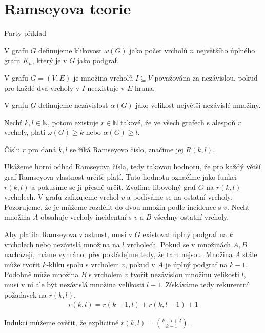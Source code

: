 \section{Ramseyova teorie}
\begin{t_example}
  Party příklad %
\end{t_example}

\begin{t_definition}
  V grafu $G$ definujeme klikovost $\omega(G)$ jako počet vrcholů $n$ největšího úplného grafu $K_n$, který je v $G$ jako podgraf.
\end{t_definition}

\begin{t_definition}
  V grafu $G=(V,E)$ je množina vrcholů $I\subseteq V$ považována za nezávislou, pokud pro každé dva vrcholy v $I$ neexistuje v $E$ hrana.
\end{t_definition}

\begin{t_definition}
  V grafu $G$ definujeme nezávislost $\alpha(G)$ jako velikost největší nezávislé množiny.
\end{t_definition}

\begin{t_theorem}
  Nechť $k,l\in\mathbb{N}$, potom existuje $r\in\mathbb{N}$ takové, že ve všech grafech s alespoň $r$ vrcholy, platí $\omega(G)\geq k$ nebo $\alpha(G)\geq l$.
\end{t_theorem}

\begin{t_remark}
  Číslu $r$ pro daná $k, l$ se říká Ramseyovo číslo, značíme jej $R(k, l)$.
\end{t_remark}

\begin{t_proof}
  Ukážeme horní odhad Ramseyova čísla, tedy takovou hodnotu, že pro každý větší graf Ramseyova vlastnost určitě platí. Tuto hodnotu označíme jako funkci $r(k,l)$ a pokusíme se jí přesně určit. Zvolíme libovolný graf $G$ na $r(k,l)$ vrcholech. V grafu zafixujeme vrchol $v$ a podíváme se na ostatní vrcholy. Pozorujeme, že je můžeme rozdělit do dvou množin podle incidence s $v$. Nechť množina $A$ obsahuje vrcholy incidentní s $v$ a $B$ všechny ostatní vrcholy.
  
  Aby platila Ramseyova vlastnost, musí v $G$ existovat úplný podgraf na $k$ vrcholech nebo nezávislá množina na $l$ vrcholech. Pokud se v množinách $A,B$ nacházejí, máme vyhráno, předpokládejme tedy, že tam nejsou. Množina $A$ stále může tvořit $k$-kliku spolu s vrcholem $v$, pokud v $A$ je úplný podgraf na $k-1$. Podobně může množina $B$ s vrcholem $v$ tvořit nezávislou množinu velikosti $l$, musí v ní ale být nezávislá množina velikosti $l-1$. Získáváme tedy rekurentní požadavek na $r(k,l)$.
  \begin{align*}
    r(k,l)=r(k-1,l)+r(k,l-1)+1
  \end{align*}

  Indukcí můžeme ověřit, že explicitně $r(k,l)=\binom{k+l+2}{k-1}$.
\end{t_proof}
